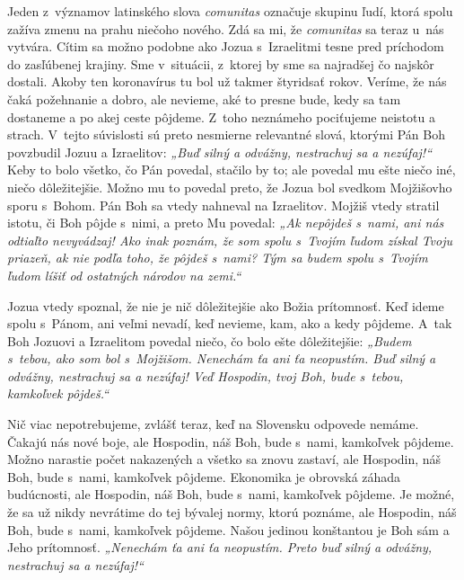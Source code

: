 


Jeden z~významov latinského slova {\it comunitas} označuje skupinu ľudí, ktorá spolu zažíva zmenu na prahu niečoho nového. Zdá sa mi, že {\it comunitas} sa teraz u~nás vytvára. Cítim sa možno podobne ako Jozua s~Izraelitmi tesne pred príchodom do zasľúbenej krajiny. Sme v~situácii, z~ktorej by sme sa najradšej čo najskôr dostali. Akoby ten koronavírus tu bol už takmer štyridsať rokov. Veríme, že nás čaká požehnanie a dobro, ale nevieme, aké to presne bude, kedy sa tam dostaneme a po akej ceste pôjdeme. Z~toho neznámeho pociťujeme neistotu a strach. V~tejto súvislosti sú preto nesmierne relevantné slová, ktorými Pán Boh povzbudil Jozuu a Izraelitov: {\it „Buď silný a odvážny, nestrachuj sa a nezúfaj!“} Keby to bolo všetko, čo Pán povedal, stačilo by to; ale povedal mu ešte niečo iné, niečo dôležitejšie. Možno mu to povedal preto, že Jozua bol svedkom Mojžišovho sporu s~Bohom. Pán Boh sa vtedy nahneval na Izraelitov. Mojžiš vtedy stratil istotu, či Boh pôjde s~nimi, a preto Mu povedal: {\it „Ak nepôjdeš s~nami, ani nás odtiaľto nevyvádzaj! Ako inak poznám, že som spolu s~Tvojím ľudom získal Tvoju priazeň, ak nie podľa toho, že pôjdeš s~nami? Tým sa budem spolu s~Tvojím ľudom líšiť od ostatných národov na zemi.“}

Jozua vtedy spoznal, že nie je nič dôležitejšie ako Božia prítomnosť. Keď ideme spolu s~Pánom, ani veľmi nevadí, keď nevieme, kam, ako a kedy pôjdeme. A~tak Boh Jozuovi a Izraelitom povedal niečo, čo bolo ešte dôležitejšie: {\it „Budem s~tebou, ako som bol s~Mojžišom. Nenechám ťa ani ťa neopustím. Buď silný a odvážny, nestrachuj sa a nezúfaj! Veď Hospodin, tvoj Boh, bude s~tebou, kamkoľvek pôjdeš.“}

Nič viac nepotrebujeme, zvlášť teraz, keď na Slovensku odpovede nemáme. Čakajú nás nové boje, ale Hospodin, náš Boh, bude s~nami, kamkoľvek pôjdeme. Možno narastie počet nakazených a všetko sa znovu zastaví, ale Hospodin, náš Boh, bude s~nami, kamkoľvek pôjdeme. Ekonomika je obrovská záhada budúcnosti, ale Hospodin, náš Boh, bude s~nami, kamkoľvek pôjdeme. Je možné, že sa už nikdy nevrátime do tej bývalej normy, ktorú poznáme, ale Hospodin, náš Boh, bude s~nami, kamkoľvek pôjdeme. Našou jedinou konštantou je Boh sám a Jeho prítomnosť. {\it „Nenechám ťa ani ťa neopustím. Preto buď silný a odvážny, nestrachuj sa a nezúfaj!“}

